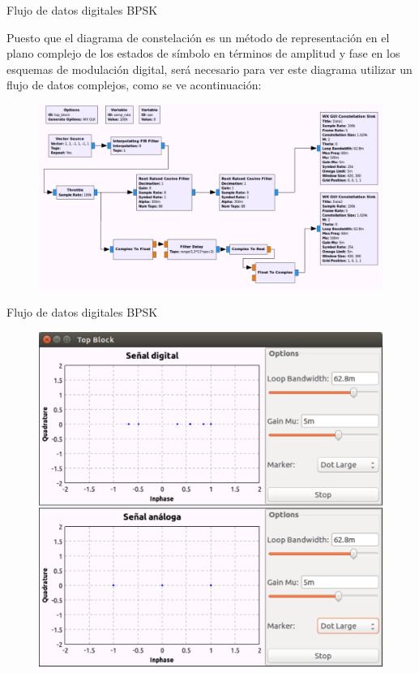 \begin{frame}{Flujo de datos digitales BPSK}
\justifying

Puesto que el diagrama de constelación es un método de representación en el
plano complejo de los estados de símbolo en términos de amplitud y fase en los
esquemas de modulación digital, será necesario para ver este diagrama  utilizar
un flujo de datos complejos, como se ve acontinuación:

\begin{figure}
\includegraphics[width=.9\textwidth]{parte1/lab5/pdf/lab5_5.pdf}
\end{figure}
\end{frame}

\begin{frame}{Flujo de datos digitales BPSK}
\begin{figure}
\includegraphics[width=.6\textwidth]{parte1/lab5/pdf/lab5_6.pdf}
\end{figure}
\end{frame}
	 
